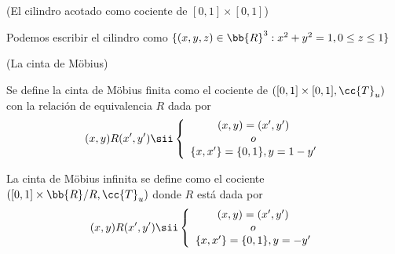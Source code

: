 \begin{ejercicio}
    (El cilindro acotado como cociente de $[0,1]\times [0,1]$)

    Podemos escribir el cilindro como $\{(x,y,z)\in \bb{R}^3: x^2+y^2=1, 0\leq z\leq 1\}$
    \endsquare
 \end{ejercicio}

 \begin{ejemplo}
    (La cinta de Möbius)

    Se define la cinta de Möbius finita como el cociente de $([0,1]\times [0,1], \cc{T}_u)$ con la relación de equivalencia $R$ dada por
    \begin{align*}
        (x,y)R(x',y') \sii \left\{
        \begin{array}{c}
            (x,y)=(x',y')\\
            o\\
            \{x,x'\}=\{0,1\}, y=1-y'
        \end{array}
        \right.
    \end{align*}

    La cinta de Möbius infinita se define como el cociente $([0,1]\times \bb{R}/R, \cc{T}_u)$ donde $R$ está dada por
    \begin{align*}
        (x,y)R(x',y') \sii \left\{
        \begin{array}{c}
            (x,y)=(x',y')\\
            o\\
            \{x,x'\}=\{0,1\}, y=-y'
        \end{array}
        \right.
    \end{align*}
    \endsquare
 \end{ejemplo}

